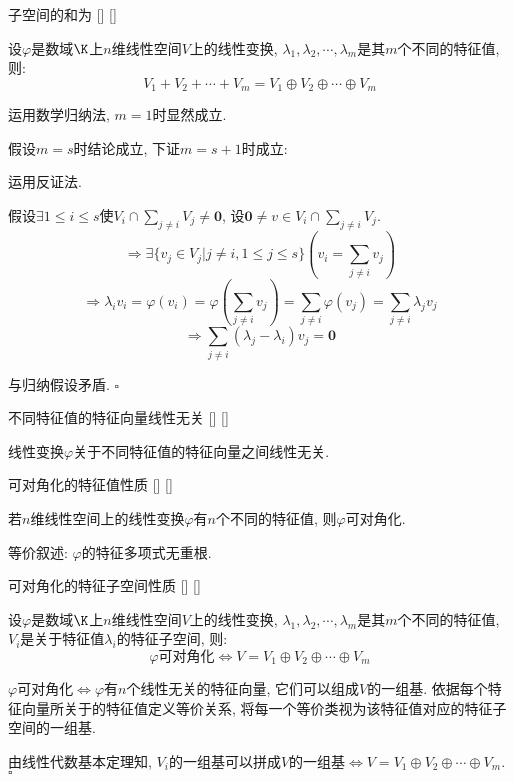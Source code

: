 \documentclass[UTF8]{ctexart}
\begin{document}
		\begin{thm}
			[]
			{子空间的和为}
			[]
			[]

			设$\varphi$是数域$\K$上$n$维线性空间$V$上的线性变换, $\lambda_1,\lambda_2,\cdots,\lambda_m$是其$m$个不同的特征值, 则: 
			\[V_1+V_2+\cdots+V_m=V_1\oplus V_2\oplus\cdots\oplus V_m\]
		\end{thm}

		\begin{prf} 

			运用数学归纳法, $m=1$时显然成立. 

			假设$m=s$时结论成立, 下证$m=s+1$时成立: 

			运用反证法. 
			
			假设$\exists 1\leq i\leq s$使$V_i\cap\sum\limits_{j\neq i}V_j\neq\mathbf{0}$, 设$\mathbf{0}\neq v\in V_i\cap\sum\limits_{j\neq i}V_j$. 
			\[\Longrightarrow\exists\{v_j\in V_j|j\neq i,1\leq j\leq s\}\left(v_i=\sum_{j\neq i}v_j\right)\]
			\[\Longrightarrow\lambda_i v_i=\varphi(v_i)=\varphi\left(\sum_{j\neq i}v_j\right)=\sum_{j\neq i}\varphi(v_j)=\sum_{j\neq i}\lambda_j v_j\]
			\[\Longrightarrow\sum_{j\neq i}(\lambda_j-\lambda_i)v_j=\mathbf{0}\]

			与归纳假设矛盾. $\square$
            \end{prf}

		\begin{ppt}
			[]
			{不同特征值的特征向量线性无关}
			[]
			[]

			线性变换$\varphi$关于不同特征值的特征向量之间线性无关. 
		\end{ppt}
		
		\begin{ppt}
			[]
			{可对角化的特征值性质}
			[]
			[]

			若$n$维线性空间上的线性变换$\varphi$有$n$个不同的特征值, 则$\varphi$可对角化. 

			等价叙述: $\varphi$的特征多项式无重根. 
		\end{ppt}
		
		\begin{ppt}
			[]
			{可对角化的特征子空间性质}
			[]
			[]

			设$\varphi$是数域$\K$上$n$维线性空间$V$上的线性变换, $\lambda_1,\lambda_2,\cdots,\lambda_m$是其$m$个不同的特征值, $V_i$是关于特征值$\lambda_i$的特征子空间, 则: 
			\[\varphi\text{可对角化}\iff V=V_1\oplus V_2\oplus\cdots\oplus V_m\]
		\end{ppt}

		\begin{prf}
			$\varphi$可对角化$\iff\varphi$有$n$个线性无关的特征向量, 它们可以组成$V$的一组基. 依据每个特征向量所关于的特征值定义等价关系, 将每一个等价类视为该特征值对应的特征子空间的一组基. 
			
			由线性代数基本定理知, $V_i$的一组基可以拼成$V$的一组基$\iff V=V_1\oplus V_2\oplus\cdots\oplus V_m$. $\square$

		\end{prf} 
			
\end{document}
